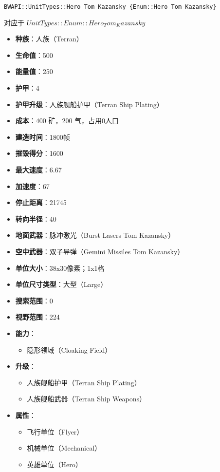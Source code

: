 \begin{tcolorbox}[colback=white, colframe=black!60!white, title=Hero\_Tom\_Kazansky(), arc=0mm]
    \begin{verbatim}
BWAPI::UnitTypes::Hero_Tom_Kazansky {Enum::Hero_Tom_Kazansky}
    \end{verbatim}
    对应于  $ UnitTypes::Enum::Hero_Tom_Kazansky $ 
    \begin{itemize}
        \item \textbf{种族}：人族（Terran）
        \item \textbf{生命值}：500
        \item \textbf{能量值}：250
        \item \textbf{护甲}：4
        \item \textbf{护甲升级}：人族舰船护甲（Terran Ship Plating）
        \item \textbf{成本}：400 矿，200 气，占用0人口
        \item \textbf{建造时间}：1800帧
        \item \textbf{摧毁得分}：1600
        \item \textbf{最大速度}：6.67
        \item \textbf{加速度}：67
        \item \textbf{停止距离}：21745
        \item \textbf{转向半径}：40
        \item \textbf{地面武器}：脉冲激光（Burst Lasers Tom Kazansky）
        \item \textbf{空中武器}：双子导弹（Gemini Missiles Tom Kazansky）
        \item \textbf{单位大小}：38x30像素；1x1格
        \item \textbf{单位尺寸类型}：大型（Large）
        \item \textbf{搜索范围}：0
        \item \textbf{视野范围}：224
        \item \textbf{能力}：
            \begin{itemize}
                \item 隐形领域（Cloaking Field）
            \end{itemize}
        \item \textbf{升级}：
            \begin{itemize}
                \item 人族舰船护甲（Terran Ship Plating）
                \item 人族舰船武器（Terran Ship Weapons）
            \end{itemize}
        \item \textbf{属性}：
            \begin{itemize}
                \item 飞行单位（Flyer）
                \item 机械单位（Mechanical）
                \item 英雄单位（Hero）
            \end{itemize}
    \end{itemize}
    
\end{tcolorbox}

